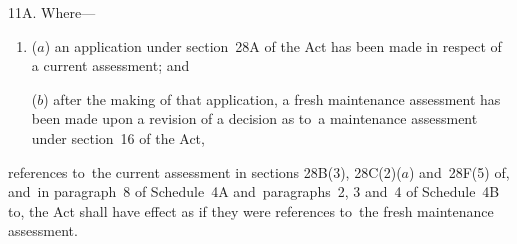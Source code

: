 \documentclass[12pt,a4paper]{article}
\begin{document}
%
%
%
%
%

11A.  Where---
\begin{enumerate}\item[]
($a$) an application under section~28A of the Act has been made in respect of a current assessment; and

($b$) after the making of that application, a fresh maintenance assessment has been made upon a revision of a decision as to~a maintenance assessment under section~16 of the Act,
\end{enumerate}
references to~the current assessment in sections 28B(3), 28C(2)($a$) and~28F(5) of, and~in paragraph~8 of Schedule~4A and~paragraphs~2, 3 and~4 of Schedule~4B to, the Act shall have effect as if they were references to~the fresh maintenance assessment.
\end{document}
